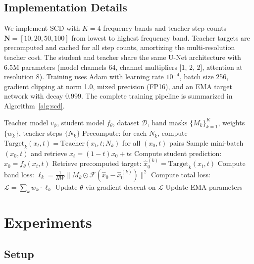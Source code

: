 \documentclass{article}
\newcommand{\scd}{\textsc{SCD}}
\newcommand{\Loss}{\mathcal{L}}
\begin{document}
\subsection{Implementation Details}

We implement \scd{} with $K=4$ frequency bands and teacher step counts $\mathbf{N} = [10, 20, 50, 100]$ from lowest to highest frequency band. Teacher targets are precomputed and cached for all step counts, amortizing the multi-resolution teacher cost. The student and teacher share the same U-Net architecture with 6.5M parameters (model channels 64, channel multipliers [1, 2, 2], attention at resolution 8). Training uses Adam with learning rate $10^{-4}$, batch size 256, gradient clipping at norm 1.0, mixed precision (FP16), and an EMA target network with decay 0.999. The complete training pipeline is summarized in Algorithm~\ref{alg:scd}.

\begin{algorithm}[t]
\caption{Spectral Consistency Distillation Training}
\label{alg:scd}
\begin{algorithmic}[1]
\REQUIRE Teacher model $v_\phi$, student model $f_\theta$, dataset $\mathcal{D}$, band masks $\{M_k\}_{k=1}^K$, weights $\{w_k\}$, teacher steps $\{N_k\}$
\STATE Precompute: for each $N_k$, compute $\text{Target}_k(x_t, t) = \text{Teacher}(x_t, t; N_k)$ for all $(x_0, t)$ pairs
    \STATE Sample mini-batch $(x_0, t)$ and retrieve $x_t = (1-t)x_0 + t\epsilon$
    \STATE Compute student prediction: $\hat{x}_0 = f_\theta(x_t, t)$
        \STATE Retrieve precomputed target: $\hat{x}_0^{(k)} = \text{Target}_k(x_t, t)$
        \STATE Compute band loss: $\ell_k = \frac{1}{HW}\|M_k \odot \mathcal{F}(\hat{x}_0 - \hat{x}_0^{(k)})\|^2$
    \ENDFOR
    \STATE Compute total loss: $\Loss = \sum_k w_k \cdot \ell_k$
    \STATE Update $\theta$ via gradient descent on $\Loss$
    \STATE Update EMA parameters
\ENDFOR
\end{algorithmic}
\end{algorithm}

\section{Experiments}
\label{sec:experiments}

\subsection{Setup}
\end{document}
